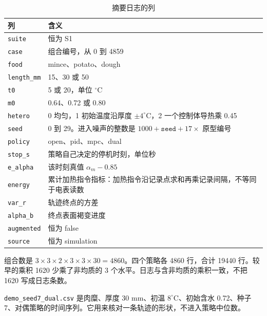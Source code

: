 \begin{table}[htbp]
\centering
\caption{摘要日志的列}
\label{tab:app-sym-log}
{\footnotesize\setlength{\tabcolsep}{2pt}
\begin{tabular}{@{}l p{4.2cm}@{}}

\toprule
列 & 含义 \\
\midrule
\texttt{suite} & 恒为 S1 \\
\texttt{case} & 组合编号，从 0 到 4859 \\
\texttt{food} & mince、potato、dough \\
\texttt{length\_mm} & 15、30 或 50 \\
\texttt{t0} & 5 或 20，单位 \(^\circ\mathrm{C}\) \\
\texttt{m0} & 0.64、0.72 或 0.80 \\
\texttt{hetero} & 0 均匀，1 初始温度沿厚度 \(\pm 4^\circ\mathrm{C}\)，2 一个控制体导热乘 0.45 \\
\texttt{seed} & 0 到 29。进入噪声的整数是 \(1000+\texttt{seed}+17\times\) 原型编号 \\
\texttt{policy} & open、pid、mpc、dual \\
\texttt{stop\_s} & 策略自己决定的停机时刻，单位秒 \\
\texttt{e\_alpha} & 该时刻真值 \(\alpha_m-0.85\) \\
\texttt{energy} & 累计加热指令指标：加热指令沿记录点求和再乘记录间隔，不等同于电表读数 \\
\texttt{var\_r} & 轨迹终点的方差 \\
\texttt{alpha\_b} & 终点表面褐变进度 \\
\texttt{augmented} & 恒为 false \\
\texttt{source} & 恒为 simulation \\
\bottomrule
\end{tabular}}
\end{table}


组合数是 \(3\times 3\times 2\times 3\times 3\times 30=4860\)。四个策略各 4860 行，合计 19440 行。较早的乘积 1620 少乘了非均质的 3 个水平。日志与含非均质的乘积一致，不把 1620 写成日志条数。

\texttt{demo\_seed7\_dual.csv} 是肉糜、厚度 30 mm、初温 \(8^\circ\mathrm{C}\)、初始含水 0.72、种子 7、对偶策略的时间序列。它用来核对一条轨迹的形状，不进入策略中位数。
